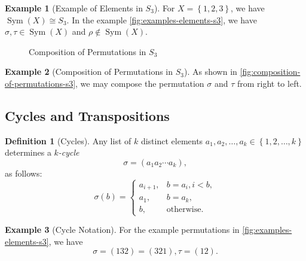 \documentclass{article}
\theoremstyle{definition}
\newtheorem{definition}[theorem]{Definition}
\newtheorem*{example*}{Example}
\theoremstyle{remark}
\newcommand{\pqty}[1]{\left(#1\right)}
\newcommand{\Bqty}[1]{\left\{#1\right\}}
\newcommand{\perm}[1]{(#1)}
\newcommand{\isomorphic}{\cong}
\newcommand{\Sym}{\operatorname{Sym}}
\begin{document}
\begin{example*}[Example of Elements in \(S_3\)]
    For \(X = \Bqty{1, 2, 3}\), we have \(\Sym\pqty{X} \isomorphic S_3\). In the example \autoref{fig:examples-elements-s3}, we have \(\sigma, \tau \in \Sym\pqty{X}\) and \(\rho \notin \Sym\pqty{X}\).
\end{example*}

\begin{figure}[ht!]
    \centering
    \caption{Composition of Permutations in \(S_3\)}
    \label{fig:composition-of-permutations-s3}
\end{figure}

\begin{example*}[Composition of Permutations in \(S_3\)]
    As shown in \autoref{fig:composition-of-permutations-s3}, we may compose the permutation \(\sigma\) and \(\tau\) from right to left.
\end{example*}

\subsection{Cycles and Transpositions}
\label{sec:cycles-and-transpositions}

\begin{definition}[Cycles]
    \label{def:cycles}%
    Any list of \(k\) distinct elements \(a_1, a_2, \ldots, a_k \in \Bqty{1, 2, \ldots, k}\) determines a \emph{\(k\)-cycle}
    \[
        \sigma = \perm{{a_1}{a_2}{\cdots}{a_k}},
    \]
    as follows:
    \[
        \sigma\pqty{b} = \begin{cases}
            a_{i + 1}, & b = a_i, i < b, \\
            a_1, & b = a_k, \\
            b, & \text{otherwise}.
        \end{cases}
    \]
\end{definition}

\begin{example*}[Cycle Notation]
    For the example permutations in \autoref{fig:examples-elements-s3}, we have
    \[
        \sigma = \perm{132} = \perm{321}, \tau = \perm{12}.
    \]
\end{example*}
\end{document}
